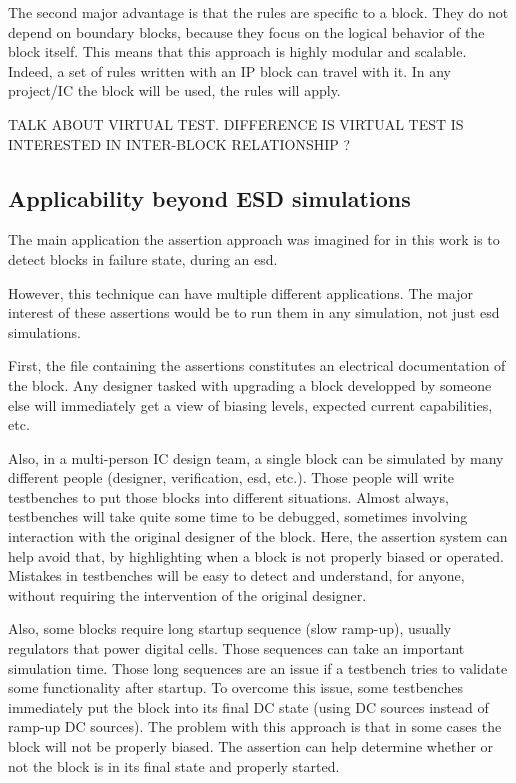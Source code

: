 The second major advantage is that the rules are specific to a block.
They do not depend on boundary blocks, because they focus on the logical behavior of the block itself.
This means that this approach is highly modular and scalable.
Indeed, a set of rules written with an IP block can travel with it.
In any project/IC the block will be used, the rules will apply.

TALK ABOUT VIRTUAL TEST. DIFFERENCE IS VIRTUAL TEST IS INTERESTED IN INTER-BLOCK RELATIONSHIP ?

\subsection{Applicability beyond ESD simulations}

The main application the assertion approach was imagined for in this work is to detect blocks in failure state,
during an \gls{esd}.

However, this technique can have multiple different applications.
The major interest of these assertions would be to run them in any simulation, not just \gls{esd} simulations.

First, the file containing the assertions constitutes an electrical documentation of the block.
Any designer tasked with upgrading a block developped by someone else will immediately get a view of biasing levels,
expected current capabilities, etc.

Also, in a multi-person IC design team, a single block can be simulated by many different people (designer, verification, esd, etc.).
Those people will write testbenches to put those blocks into different situations.
Almost always, testbenches will take quite some time to be debugged, sometimes involving interaction with the original designer of the block.
Here, the assertion system can help avoid that, by highlighting when a block is not properly biased or operated.
Mistakes in testbenches will be easy to detect and understand, for anyone, without requiring the intervention of the original designer.

Also, some blocks require long startup sequence (slow ramp-up), usually regulators that power digital cells.
Those sequences can take an important simulation time.
Those long sequences are an issue if a testbench tries to validate some functionality after startup.
To overcome this issue, some testbenches immediately put the block into its final DC state (using DC sources instead of ramp-up DC sources).
The problem with this approach is that in some cases the block will not be properly biased.
The assertion can help determine whether or not the block is in its final state and properly started.

